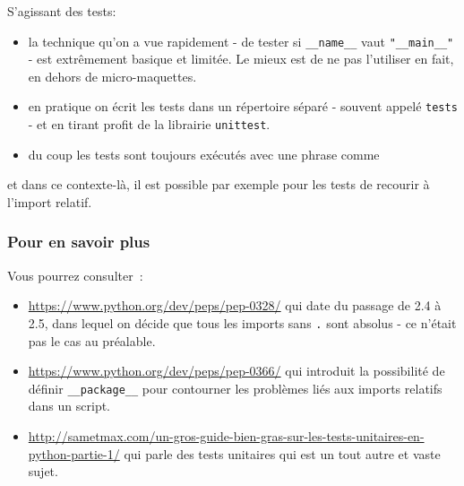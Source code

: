 S'agissant des tests:

\begin{itemize}
\tightlist
\item
  la technique qu'on a vue rapidement - de tester si
  \texttt{\_\_name\_\_} vaut \texttt{"\_\_main\_\_"} - est extrêmement
  basique et limitée. Le mieux est de ne pas l'utiliser en fait, en
  dehors de micro-maquettes.
\item
  en pratique on écrit les tests dans un répertoire séparé - souvent
  appelé \texttt{tests} - et en tirant profit de la librairie
  \texttt{unittest}.
\item
  du coup les tests sont toujours exécutés avec une phrase comme
\end{itemize}

\begin{Shaded}
\begin{Highlighting}[frame=lines,framerule=0.6mm,rulecolor=\color{asisframecolor}]
\end{Highlighting}
\end{Shaded}

et dans ce contexte-là, il est possible par exemple pour les tests de
recourir à l'import relatif.

    \hypertarget{pour-en-savoir-plus}{%
\subsubsection{Pour en savoir plus}\label{pour-en-savoir-plus}}

    Vous pourrez consulter~:

\begin{itemize}
\tightlist
\item
  \url{https://www.python.org/dev/peps/pep-0328/} qui date du passage de
  2.4 à 2.5, dans lequel on décide que tous les imports sans \texttt{.}
  sont absolus - ce n'était pas le cas au préalable.
\item
  \url{https://www.python.org/dev/peps/pep-0366/} qui introduit la
  possibilité de définir \texttt{\_\_package\_\_} pour contourner les
  problèmes liés aux imports relatifs dans un script.
\item
  \url{http://sametmax.com/un-gros-guide-bien-gras-sur-les-tests-unitaires-en-python-partie-1/}
  qui parle des tests unitaires qui est un tout autre et vaste sujet.
\end{itemize}


    
    
    
